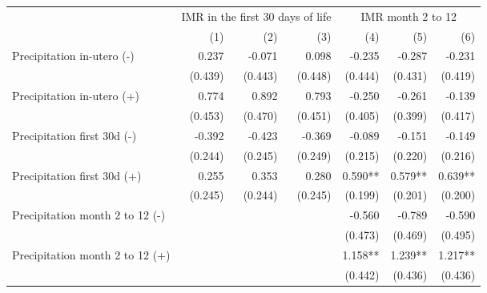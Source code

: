 \begin{tabular}{lrrrrrr}
\toprule
                                            &      \multicolumn{3}{c}{IMR in the first 30 days of life}     &   \multicolumn{3}{c}{IMR month 2 to 12}      \\ 
\cmidrule(lr){2-4} \cmidrule(lr){5-7} 
                                            &          (1) &        (2)  &        (3)   &       (4) &       (5) &       (6)  \\ 
\midrule 
Precipitation in-utero (-)                           &      0.237  &     -0.071  &      0.098   &     -0.235   &     -0.287   &    -0.231    \\  
                                            &    (0.439)  &    (0.443)  &    (0.448)   &    (0.444)   &    (0.431)   &   (0.419)    \\  
Precipitation in-utero (+)                           &      0.774  &      0.892  &      0.793   &     -0.250   &     -0.261   &    -0.139    \\  
                                            &    (0.453)  &    (0.470)  &    (0.451)   &    (0.405)   &    (0.399)   &   (0.417)    \\  
Precipitation first 30d (-)                          &     -0.392  &     -0.423  &     -0.369   &     -0.089   &     -0.151   &    -0.149    \\
                                            &    (0.244)  &    (0.245)  &    (0.249)   &    (0.215)   &    (0.220)   &   (0.216)    \\
Precipitation first 30d (+)                          &      0.255  &      0.353  &      0.280   &    0.590**   &    0.579**   &   0.639**    \\
                                            &    (0.245)  &    (0.244)  &    (0.245)   &    (0.199)   &    (0.201)   &   (0.200)    \\
Precipitation month 2 to 12  (-)                     &             &             &              &     -0.560   &     -0.789   &    -0.590    \\ 
                                            &             &             &              &    (0.473)   &    (0.469)   &   (0.495)    \\ 
Precipitation month 2 to 12 (+)                      &             &             &              &    1.158**   &    1.239**   &   1.217**    \\ 
                                            &             &             &              &    (0.442)   &    (0.436)   &   (0.436)    \\ 

\end{tabular}
